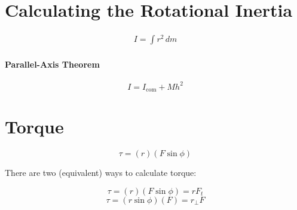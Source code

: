 \documentclass{article}
\begin{document}
    \section{Calculating the Rotational Inertia}

        \begin{eqnarray}
            I = \int r^2 \, dm
        \end{eqnarray}

        \paragraph{Parallel-Axis Theorem}
        \begin{equation}
            I = I_\text{com} + M h^2
        \end{equation}

    \section{Torque}

        \begin{equation}
            \tau = \left( r \right) \left( F \sin{\phi} \right)
        \end{equation}

        There are two (equivalent) ways to calculate torque:

        \begin{equation}
            \tau = \left( r \right) \left( F \sin{\phi} \right) = r F_t
        \end{equation}
        \begin{equation}
            \tau = \left( r \sin{\phi} \right) \left( F \right) = r_\perp F
        \end{equation}
\end{document}
